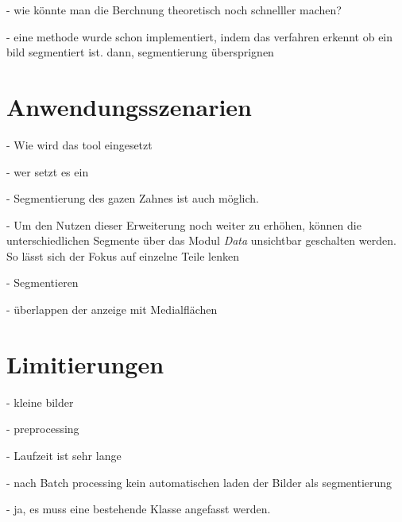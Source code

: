 - wie könnte man die Berchnung theoretisch noch schnelller machen?

- eine methode wurde schon implementiert, indem das verfahren erkennt ob ein bild
segmentiert ist. dann, segmentierung übersprignen

\section{Anwendungsszenarien}
- Wie wird das tool eingesetzt

- wer setzt es ein

- Segmentierung des gazen Zahnes ist auch möglich.

- Um den Nutzen dieser Erweiterung noch weiter zu erhöhen, können die unterschiedlichen
Segmente über das Modul \textit{Data} unsichtbar geschalten werden. So lässt sich
der Fokus auf einzelne Teile lenken

- Segmentieren

- überlappen der anzeige mit Medialflächen


\section{Limitierungen}

- kleine bilder

- preprocessing

- Laufzeit ist sehr lange

- nach Batch processing kein automatischen laden der Bilder als segmentierung

- ja, es muss eine bestehende Klasse angefasst werden.
